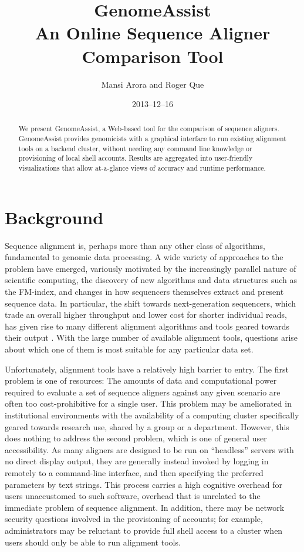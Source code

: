 \documentclass[11pt,twocolumn]{article}
\begin{document}
\title{\textbf{GenomeAssist}\\
       An Online Sequence Aligner Comparison Tool}
\author{Mansi Arora and Roger Que}
\date{2013--12--16}
\maketitle


\begin{abstract}
We present GenomeAssist, a Web-based tool for the comparison of
sequence aligners.
GenomeAssist provides genomicists with a graphical interface to run
existing alignment tools on a backend cluster, without needing any
command line knowledge or provisioning of local shell accounts.
Results are aggregated into user-friendly visualizations that allow
at-a-glance views of accuracy and runtime performance.
\end{abstract}


\section{Background}
Sequence alignment is, perhaps more than any other class of algorithms,
fundamental to genomic data processing.
A wide variety of approaches to the problem have emerged, variously
motivated by the increasingly parallel nature of scientific computing,
the discovery of new algorithms and data structures such as the
FM-index, and changes in how sequencers themselves extract and present
sequence data.
In particular, the shift towards next-generation sequencers, which trade
an overall higher throughput and lower cost for shorter individual
reads, has given rise to many different alignment algorithms and tools
geared towards their output \cite{Li:2010}.
With the large number of available alignment tools, questions arise
about which one of them is most suitable for any particular data set.

Unfortunately, alignment tools have a relatively high barrier to entry.
The first problem is one of resources:
The amounts of data and computational power required to evaluate
a set of sequence aligners against any given scenario are often too
cost-prohibitive for a single user.
This problem may be ameliorated in institutional environments with the
availability of a computing cluster specifically geared towards research
use, shared by a group or a department.
However, this does nothing to address the second problem, which is one
of general user accessibility.
As many aligners are designed to be run on ``headless'' servers with no
direct display output, they are generally instead invoked by logging in
remotely to a command-line interface, and then specifying the preferred
parameters by text strings.
This process carries a high cognitive overhead for users unaccustomed to
such software, overhead that is unrelated to the immediate problem of
sequence alignment.
In addition, there may be network security questions involved in the
provisioning of accounts; for example, administrators may be reluctant
to provide full shell access to a cluster when users should only be able
to run alignment tools.
\end{document}
